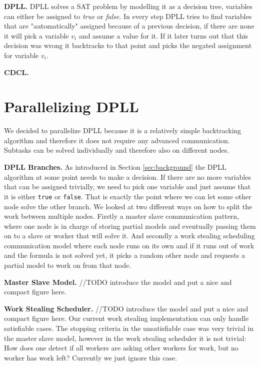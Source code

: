 \documentclass[letterpaper]{article}
\newcommand{\mypar}[1]{{\bf #1.}}
\begin{document}
\mypar{DPLL} DPLL solves a SAT problem by modelling it as a decision tree, variables can either be assigned to \textit{true} or \textit{false}. In every step DPLL tries to find variables that are "automatically" assigned because of a previous decision,
if there are none it will pick a variable $v_i$ and assume a value for it.
If it later turns out that this decision was wrong it backtracks to that point and picks the negated assignment for variable $v_i$.

\mypar{CDCL}  \cite{cdcl}

\section{Parallelizing DPLL}\label{sec:parallel_dpll}

We decided to parallelize DPLL because it is a relatively simple backtracking algorithm and therefore it does not require any advanced communication.
Subtasks can be solved individually and therefore also on different nodes.

\mypar{DPLL Branches}
As introduced in Section \ref{sec:background} the DPLL algorithm at some point needs to make a decision.
If there are no more variables that can be assigned trivially, we need to pick one variable and just assume that it is either \texttt{true} or \texttt{false}.
That is exactly the point where we can let some other node solve the other branch.
We looked at two different ways on how to split the work between multiple nodes.
Firstly a master slave communication pattern, where one node is in charge of storing partial models and eventually passing them on to a slave or worker that will solve it.
And secondly a work stealing scheduling communication model where each node runs on its own and if it runs out of work and the formula is not solved yet,
it picks a random other node and requests a partial model to work on from that node.

\mypar{Master Slave Model}
//TODO introduce the model and put a nice and compact figure here.

\mypar{Work Stealing Scheduler}
//TODO introduce the model and put a nice and compact figure here.
Our current work stealing implementation can only handle satisfiable cases.
The stopping criteria in the unsatisfiable case was very trivial in the master slave model, however in the work stealing scheduler it is not trivial:
How does one detect if all workers are asking other workers for work, but no worker has work left?
Currently we just ignore this case.
\end{document}
